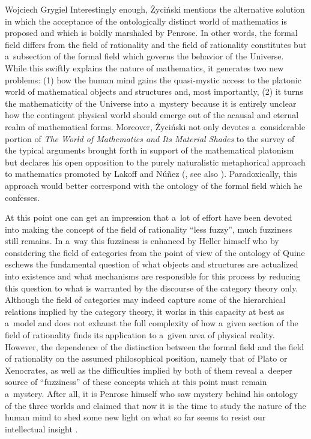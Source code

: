 \begin{artengenv}{Wojciech Grygiel}
Interestingly enough, Życiński mentions the alternative solution in which the acceptance of the ontologically distinct world of mathematics is proposed and which is boldly marshaled by Penrose. In other words, the formal field differs from the field of rationality and the field of rationality constitutes but a~subsection of the formal field which governs the behavior of the Universe. While this swiftly explains the nature of mathematics, it generates two new problems: (1) how the human mind gains the quasi-mystic access to the platonic world of mathematical objects and structures and, most importantly, (2) it turns the mathematicity of the Universe into a~mystery because it is entirely unclear how the contingent physical world should emerge out of the acausal and eternal realm of mathematical forms. Moreover, Życiński not only devotes a~considerable portion of \textit{The World of Mathematics and Its Material Shades} to the survey of the typical arguments brought forth in support of the mathematical platonism but declares his open opposition to the purely naturalistic metaphorical approach to mathematics promoted by Lakoff and Núñez
(\cite*[][]{lakoff_where_2000}, see also \cite[][pp.48–49]{zycinski_swiat_2013}). %
 Paradoxically, this approach would better correspond with the ontology of the formal field which he confesses.

At this point one can get an impression that a~lot of effort have been devoted into making the concept of the field of rationality ``less fuzzy'', much fuzziness still remains. In a~way this fuzziness is enhanced by Heller himself who by considering the field of categories from the point of view of the ontology of Quine eschews the fundamental question of what objects and structures are actualized into existence and what mechanisms are responsible for this process by reducing this question to what is warranted by the discourse of the category theory only. Although the field of categories may indeed capture some of the hierarchical relations implied by the category theory, it works in this capacity at best as a~model and does not exhaust the full complexity of how a~given section of the field of rationality finds its application to a~given area of physical reality. However, the dependence of the distinction between the formal field and the field of rationality on the assumed philosophical position, namely that of Plato or Xenocrates, as well as the difficulties implied by both of them reveal a~deeper source of ``fuzziness'' of these concepts which at this point must remain a~mystery. After all, it is Penrose himself who saw mystery behind his ontology of the three worlds and claimed that now it is the time to study the nature of the human mind to shed some new light on what so far seems to resist our intellectual insight
\parencite[][]{brozek_umysl_2014}.%


\end{artengenv}
